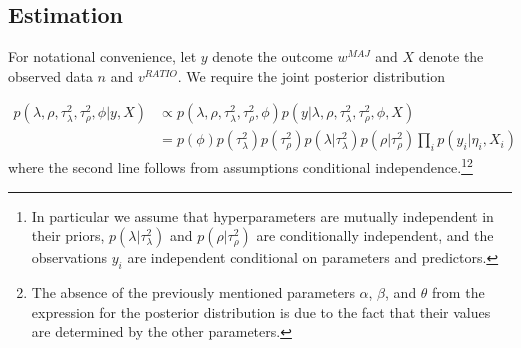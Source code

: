 %
%



\subsection{Estimation}

For notational convenience, let $y$ denote the outcome $w^{MAJ}$ and $X$ denote the observed data $n$ and $v^{RATIO}$. We require the joint posterior distribution

{\singlespacing
\begin{align*}
p(\lambda, \rho, \tau^2_\lambda, \tau^2_\rho, \phi | y, X) & \propto p(\lambda, \rho, \tau^2_\lambda, \tau^2_\rho, \phi) p(y | \lambda, \rho, \tau^2_\lambda, \tau^2_\rho, \phi,  X)  \\
& = p(\phi) p(\tau^2_\lambda) p(\tau^2_\rho)  p(\lambda | \tau^2_\lambda) p(\rho | \tau^2_\rho) \prod_i p(y_i | \eta_i, X_i) 
\end{align*}
}
%
\noindent where the second line follows from assumptions conditional independence.\footnote{In particular we assume that hyperparameters are mutually independent in their priors, $p(\lambda | \tau^2_\lambda)$ and $p(\rho | \tau^2_\rho)$ are conditionally independent, and the observations $y_i$ are independent conditional on parameters and predictors.}\footnote{The absence of the previously mentioned parameters $\alpha$, $\beta$, and $\theta$ from the expression for the posterior distribution is due to the fact that their values are determined by the other parameters.} 

